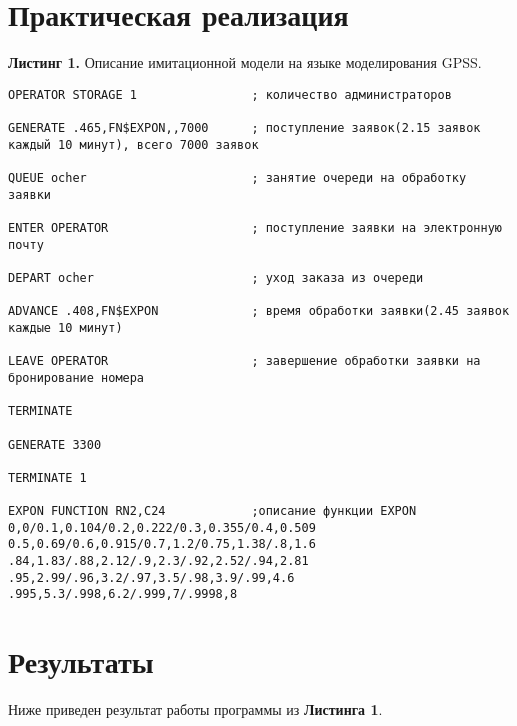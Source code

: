 \documentclass[a4paper, 12pt]{article}   	%
\begin{document}
\newpage

\section{Практическая реализация}

\textbf{Листинг 1.} Описание имитационной модели на языке моделирования GPSS.
\begin{verbatim}
OPERATOR STORAGE 1                ; количество администраторов

GENERATE .465,FN$EXPON,,7000      ; поступление заявок(2.15 заявок каждый 10 минут), всего 7000 заявок

QUEUE ocher                       ; занятие очереди на обработку заявки

ENTER OPERATOR                    ; поступление заявки на электронную почту

DEPART ocher                      ; уход заказа из очереди

ADVANCE .408,FN$EXPON             ; время обработки заявки(2.45 заявок каждые 10 минут)

LEAVE OPERATOR                    ; завершение обработки заявки на бронирование номера

TERMINATE

GENERATE 3300

TERMINATE 1

EXPON FUNCTION RN2,C24            ;описание функции EXPON
0,0/0.1,0.104/0.2,0.222/0.3,0.355/0.4,0.509
0.5,0.69/0.6,0.915/0.7,1.2/0.75,1.38/.8,1.6
.84,1.83/.88,2.12/.9,2.3/.92,2.52/.94,2.81
.95,2.99/.96,3.2/.97,3.5/.98,3.9/.99,4.6
.995,5.3/.998,6.2/.999,7/.9998,8
\end{verbatim}

\newpage
\section{Результаты}
    Ниже приведен результат работы программы из \textbf{Листинга 1}.
    
\end{document}
